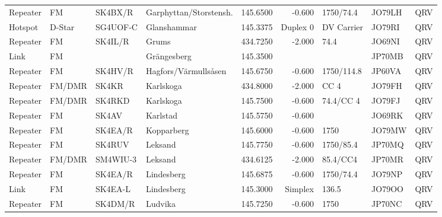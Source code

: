 {\begin{landscape}
\begin{longtable}{llllrrlll}
	Repeater              & FM         & SK4BX/R  & Garphyttan/Storstensh. &     145.6500 &     -0.600 & 1750/74.4         & JO79LH      & QRV      \\
	Hotspot               & D-Star     & SG4UOF-C & Glanshammar            &     145.3375 &   Duplex 0 & DV Carrier        & JO79RI      & QRV      \\
	Repeater              & FM         & SK4IL/R  & Grums                  &     434.7250 &     -2.000 & 74.4              & JO69NI      & QRV      \\
	Link                  & FM         &          & Grängesberg            &     145.3500 &            &                   & JP70MB      & QRV      \\
	Repeater              & FM         & SK4HV/R  & Hagfors/Värmullsåsen   &     145.6750 &     -0.600 & 1750/114.8        & JP60VA      & QRV      \\
	Repeater              & FM/DMR     & SK4KR    & Karlskoga              &     434.8000 &     -2.000 & CC 4              & JO79FH      & QRV      \\
	Repeater              & FM/DMR     & SK4RKD   & Karlskoga              &     145.7500 &     -0.600 & 74.4/CC 4         & JO79FJ      & QRV      \\
	Repeater              & FM         & SK4AV    & Karlstad               &     145.5750 &     -0.600 &                   & JO69RK      & QRV      \\
	Repeater              & FM         & SK4EA/R  & Kopparberg             &     145.6000 &     -0.600 & 1750              & JO79MW      & QRV      \\
	Repeater              & FM         & SK4RUV   & Leksand                &     145.7750 &     -0.600 & 1750/85.4         & JP70MQ      & QRV      \\
	Repeater              & FM/DMR     & SM4WIU-3 & Leksand                &     434.6125 &     -2.000 & 85.4/CC4          & JP70MR      & QRV      \\
	Repeater              & FM         & SK4EA/R  & Lindesberg             &     145.6875 &     -0.600 & 1750/74.4         & JO79NP      & QRV      \\
	Link                  & FM         & SK4EA-L  & Lindesberg             &     145.3000 &    Simplex & 136.5             & JO79OO      & QRV      \\
	Repeater              & FM         & SK4DM/R  & Ludvika                &     145.7250 &     -0.600 & 1750              & JP70NC      & QRV      \\

\end{longtable}
\end{landscape}}
